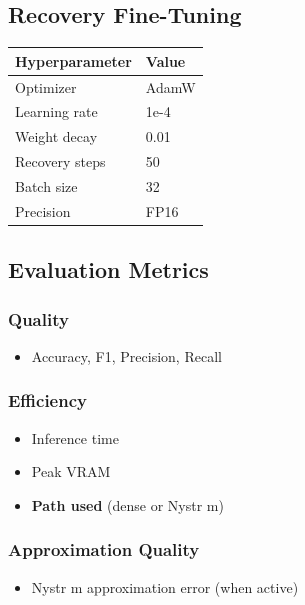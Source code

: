 \subsection{Recovery Fine-Tuning}

\begin{table}[H]
\centering
\small
\begin{tabular}{ll}
\toprule
\textbf{Hyperparameter} & \textbf{Value} \\
\midrule
Optimizer & AdamW \\
Learning rate & 1e-4 \\
Weight decay & 0.01 \\
Recovery steps & 50 \\
Batch size & 32 \\
Precision & FP16 \\
\bottomrule
\end{tabular}
\end{table}

\subsection{Evaluation Metrics}

\subsubsection{Quality}
\begin{itemize}
\item Accuracy, F1, Precision, Recall

\end{itemize}
\subsubsection{Efficiency}
\begin{itemize}
\item Inference time
\item Peak VRAM
\item \textbf{Path used} (dense or Nystr m)

\end{itemize}
\subsubsection{Approximation Quality}
\begin{itemize}
\item Nystr m approximation error (when active)

\end{itemize}
